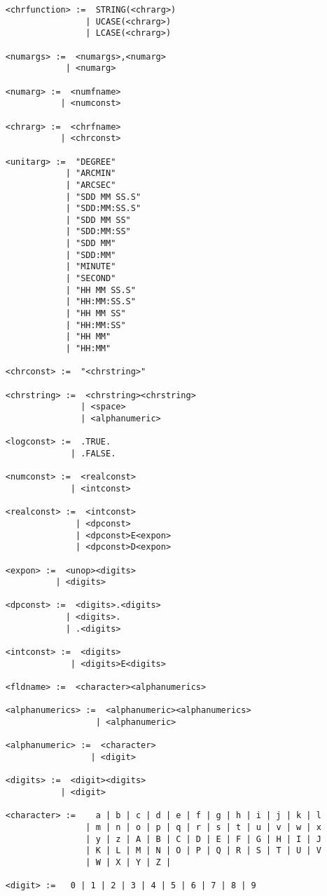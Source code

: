 \begin{small}
\begin{verbatim}
     <chrfunction> :=  STRING(<chrarg>)
                     | UCASE(<chrarg>)
                     | LCASE(<chrarg>)

     <numargs> :=  <numargs>,<numarg>
                 | <numarg>

     <numarg> :=  <numfname>
                | <numconst>

     <chrarg> :=  <chrfname>
                | <chrconst>
 
     <unitarg> :=  "DEGREE"
                 | "ARCMIN"
                 | "ARCSEC"     
                 | "SDD MM SS.S"
                 | "SDD:MM:SS.S"
                 | "SDD MM SS"
                 | "SDD:MM:SS"
                 | "SDD MM"
                 | "SDD:MM"
                 | "MINUTE"
                 | "SECOND"     
                 | "HH MM SS.S"
                 | "HH:MM:SS.S"
                 | "HH MM SS"
                 | "HH:MM:SS"
                 | "HH MM"
                 | "HH:MM"

     <chrconst> :=  "<chrstring>"

     <chrstring> :=  <chrstring><chrstring>
                    | <space>
                    | <alphanumeric>

     <logconst> :=  .TRUE.
                  | .FALSE.

     <numconst> :=  <realconst>
                  | <intconst>
              
     <realconst> :=  <intconst>
                   | <dpconst>
                   | <dpconst>E<expon>
                   | <dpconst>D<expon>

     <expon> :=  <unop><digits>
               | <digits>

     <dpconst> :=  <digits>.<digits>
                 | <digits>.
                 | .<digits>

     <intconst> :=  <digits>
                  | <digits>E<digits>

     <fldname> :=  <character><alphanumerics>

     <alphanumerics> :=  <alphanumeric><alphanumerics>
                       | <alphanumeric>

     <alphanumeric> :=  <character>
                      | <digit>

     <digits> :=  <digit><digits>
                | <digit>

     <character> :=    a | b | c | d | e | f | g | h | i | j | k | l 
                     | m | n | o | p | q | r | s | t | u | v | w | x 
                     | y | z | A | B | C | D | E | F | G | H | I | J
                     | K | L | M | N | O | P | Q | R | S | T | U | V 
                     | W | X | Y | Z |
   
     <digit> :=   0 | 1 | 2 | 3 | 4 | 5 | 6 | 7 | 8 | 9
\end{verbatim}
\end{small}


